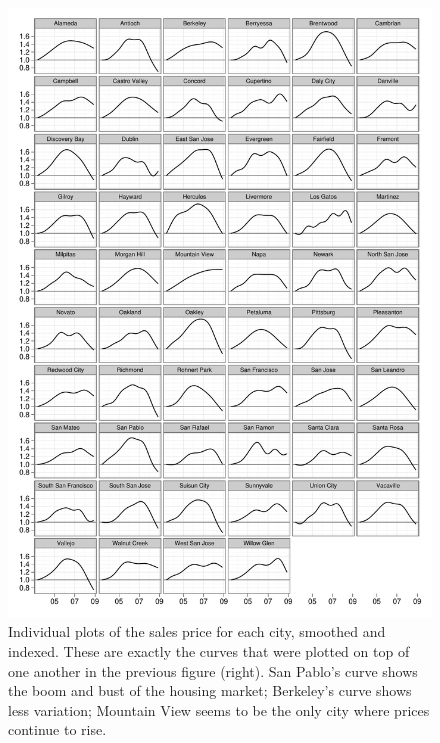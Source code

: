 \documentclass[oneside]{article}
\begin{document}
\begin{figure}[htbp]
  \centering
  \includegraphics[width=0.9\linewidth]{cities-individual}
  \caption{Individual plots of the sales price for each city, smoothed and indexed.  These are exactly the curves that were plotted on top of one another in the previous figure (right).  San Pablo's curve shows the boom and bust of the housing market; Berkeley's curve shows less variation; Mountain View seems to be the only city where prices continue to rise. }
  \label{fig:individual}
\end{figure}
\end{document}
